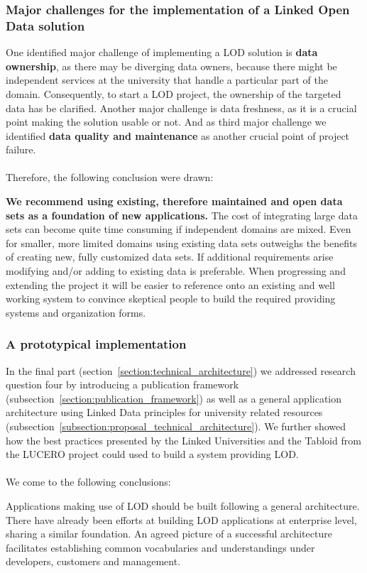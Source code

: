 \subsubsection{Major challenges for the implementation of a Linked Open Data solution}
One identified major challenge of implementing a LOD solution is \textbf{data ownership}, as there may be diverging data owners, because there might be independent services at the university that handle a particular part of the domain. Consequently, to start a LOD project, the ownership of the targeted data has be clarified. Another major challenge is data freshness, as it is a crucial point making the solution usable or not. And as third major challenge we identified \textbf{data quality and maintenance} as another crucial point of project failure.
\\~\\
Therefore, the following conclusion were drawn:

\textbf{We recommend using existing, therefore maintained and open data sets as a foundation of new applications.} The cost of integrating large data sets can become quite time consuming if independent domains are mixed. Even for smaller, more limited domains using existing data sets outweighs the benefits of creating new, fully customized data sets. If additional requirements arise
modifying and/or adding to existing data is preferable. When progressing and extending the project it will be easier to reference onto an existing and well working system to convince skeptical people to build the required providing systems and organization forms.

\subsubsection{A prototypical implementation}
In the final part (section~\ref{section:technical_architecture}) we addressed research question four by introducing a publication framework (subsection~\ref{section:publication_framework}) as well as a general application architecture using Linked Data principles for university related resources (subsection~\ref{subsection:proposal_technical_architecture}). We further showed how the best practices presented by the Linked Universities and the Tabloid from the LUCERO project could used to build a system providing LOD.
\\~\\
We come to the following conclusions:

Applications making use of LOD should be built following a general architecture. There have already been efforts at building LOD applications at enterprise level, sharing a similar foundation. An agreed picture of a successful architecture facilitates establishing common vocabularies and understandings under developers, customers and management.


